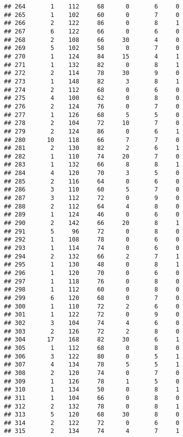 \documentclass[
]{article}
\begin{document}
\begin{verbatim}
## 264       1    112     68      0       6     0
## 265       1    102     60      0       7     0
## 266       2    122     86      0       8     1
## 267       6    122     66      0       6     0
## 268       2    108     66     30       4     0
## 269       5    102     58      0       7     0
## 270       1    124     84     15       4     1
## 271       1    132     82      0       8     1
## 272       2    114     78     30       9     0
## 273       1    148     82      3       8     1
## 274       2    112     68      0       6     0
## 275       4    100     62      0       8     0
## 276       2    124     76      0       7     0
## 277       1    126     68      5       5     0
## 278       2    104     72     10       7     0
## 279       2    124     86      0       6     1
## 280      10    118     66      7       7     0
## 281       2    130     82      2       6     1
## 282       1    110     74     20       7     0
## 283       1    132     66      8       8     1
## 284       4    120     70      3       5     0
## 285       2    116     64      0       6     0
## 286       3    110     60      5       7     0
## 287       3    112     72      0       9     0
## 288       2    112     64      4       8     0
## 289       1    124     46      0       6     0
## 290       2    142     66     20       8     1
## 291       5     96     72      0       8     0
## 292       1    108     78      0       6     0
## 293       1    114     74      0       6     0
## 294       2    132     66      2       7     1
## 295       1    130     48      0       8     1
## 296       1    120     70      0       6     0
## 297       1    118     76      0       8     0
## 298       1    112     60      0       8     0
## 299       6    120     68      0       7     0
## 300       1    110     72      2       6     0
## 301       1    122     72      0       9     0
## 302       3    104     74      4       6     0
## 303       2    126     72      2       8     0
## 304      17    168     82     30       6     1
## 305       1    112     68      0       8     0
## 306       3    122     80      0       5     1
## 307       4    134     78      5       5     1
## 308       2    120     74      0       7     0
## 309       1    126     78      1       5     0
## 310       1    134     50      0       8     1
## 311       1    104     66      0       8     0
## 312       2    132     78      0       8     1
## 313       5    120     68     30       8     0
## 314       2    122     72      0       6     0
## 315       2    134     74      4       7     1

\end{verbatim}
\end{document}
